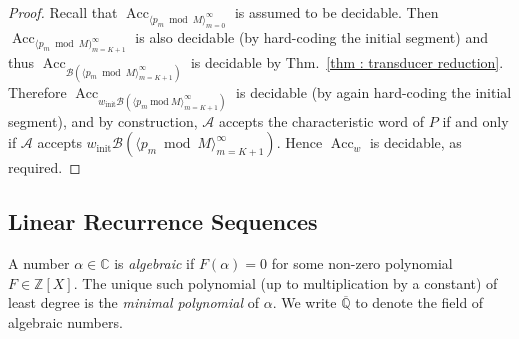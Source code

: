 \documentclass[a4paper,UKenglish,cleveref, autoref, thm-restate]{lipics-v2021}
\newcommand{\alg} {\overline{\mathbb{Q}}}
\newcommand{\Acc} {\operatorname{Acc}}
\begin{document}
\begin{proof}
    Recall that $\Acc_{\langle p_m\bmod M\rangle_{m=0}^\infty}$ is assumed to be decidable. 
    Then $\Acc_{\langle p_m\bmod M)_{m=K+1}^\infty}$ is also
    decidable (by hard-coding the initial segment) and thus
    $\Acc_{\mathcal{B}(\langle p_m\bmod M\rangle_{m=K+1}^\infty)}$ is decidable by Thm.~\ref{thm : transducer reduction}.
    Therefore $\Acc_{w_\text{init}\mathcal{B}(\langle p_m\
      \mathrm{mod}\ M\rangle_{m=K+1}^\infty)}$ is decidable (by again
    hard-coding the initial segment), and by construction, $\mathcal{A}$ accepts
    the characteristic word of $P$ if and only if $\mathcal{A}$
    accepts $w_\text{init}\mathcal{B}(\langle p_m\bmod M\rangle_{m=K+1}^\infty)$. 
    Hence $\Acc_w$ is decidable, as required.
\end{proof}

\subsection{Linear Recurrence Sequences}\label{sec : LRS}
A number $\alpha \in \mathbb{C}$ is \emph{algebraic} if $F(\alpha) = 0$ for some non-zero polynomial $F \in \mathbb{Z}[X]$.
The unique such polynomial (up to multiplication by a constant) of least degree is the \emph{minimal polynomial} of $\alpha$.
We write $\alg$ to denote the field of algebraic numbers.
\end{document}
